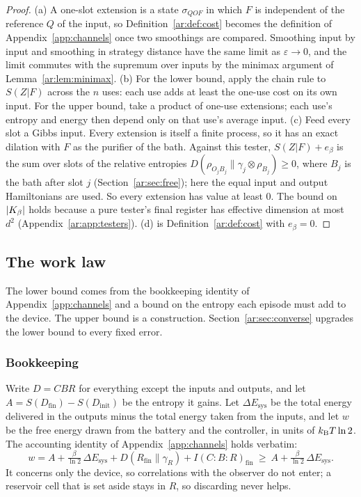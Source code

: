 \begin{proof}
(a) A one-slot extension is a state $\sigma_{QOF}$ in which $F$ is independent of the reference $Q$ of the input, so Definition~\ref{ar:def:cost} becomes the definition of Appendix~\ref{app:channels} once two smoothings are compared. Smoothing input by input and smoothing in strategy distance have the same limit as $\varepsilon\to0$, and the limit commutes with the supremum over inputs by the minimax argument of Lemma~\ref{ar:lem:minimax}. (b) For the lower bound, apply the chain rule to $S(Z|F)$ across the $n$ uses: each use adds at least the one-use cost on its own input. For the upper bound, take a product of one-use extensions; each use's entropy and energy then depend only on that use's average input. (c) Feed every slot a Gibbs input. Every extension is itself a finite process, so it has an exact dilation with $F$ as the purifier of the bath. Against this tester, $S(Z|F)+e_\beta$ is the sum over slots of the relative entropies $D(\rho_{O_jB_j}\|\gamma_j\otimes\rho_{B_j})\ge0$, where $B_j$ is the bath after slot $j$ (Section~\ref{ar:sec:free}); here the equal input and output Hamiltonians are used. So every extension has value at least $0$. The bound on $|K_\beta|$ holds because a pure tester's final register has effective dimension at most $d^2$ (Appendix~\ref{ar:app:testers}). (d) is Definition~\ref{ar:def:cost} with $e_\beta=0$.
\end{proof}

\subsection{The work law}\label{ar:sec:law}

The lower bound comes from the bookkeeping identity of Appendix~\ref{app:channels} and a bound on the entropy each episode must add to the device. The upper bound is a construction. Section~\ref{ar:sec:converse} upgrades the lower bound to every fixed error.

\subsubsection{Bookkeeping}

Write $D=CBR$ for everything except the inputs and outputs, and let $A=S(D_{\mathrm{fin}})-S(D_{\mathrm{init}})$ be the entropy it gains. Let $\Delta E_{\mathrm{sys}}$ be the total energy delivered in the outputs minus the total energy taken from the inputs, and let $w$ be the free energy drawn from the battery and the controller, in units of $k_{\mathrm B} T\ln2$. The accounting identity of Appendix~\ref{app:channels} holds verbatim:
\begin{equation}\label{ar:eq:accounting}
w=A+\tfrac{\beta}{\ln2}\,\Delta E_{\mathrm{sys}}+D(R_{\mathrm{fin}}\|\gamma_R)+I(C{:}B{:}R)_{\mathrm{fin}}\ \ge\ A+\tfrac{\beta}{\ln2}\,\Delta E_{\mathrm{sys}}.
\end{equation}
It concerns only the device, so correlations with the observer do not enter; a reservoir cell that is set aside stays in $R$, so discarding never helps.

